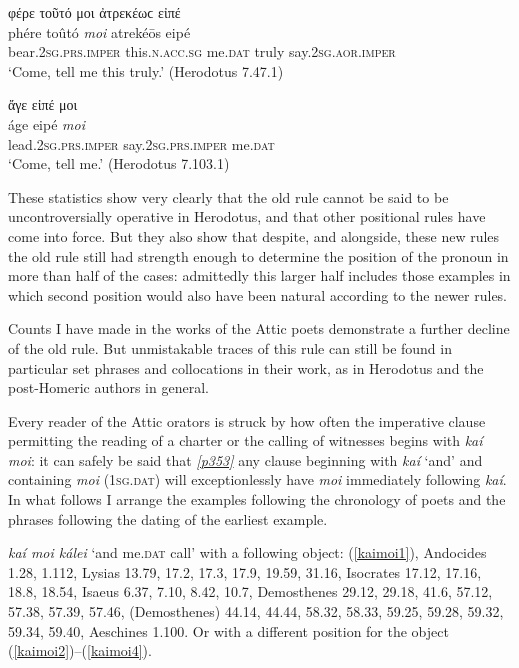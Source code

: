 \begin{exe}
\ex φέρε τοῦτό μοι ἀτρεκέωϲ εἰπέ\\
\gll phére toûtó \emph{moi} atrekéōs eipé\\
bear.\textsc{2sg.prs.imper} this.\textsc{n.acc.sg} me.\textsc{dat}
truly say.\textsc{2sg.aor.imper}\\
\trans `Come, tell me this truly.' (Herodotus 7.47.1)
\label{moi2}
\end{exe}

\begin{exe}
\ex ἄγε εἰπέ μοι\\
\gll áge eipé \emph{moi}\\
lead.\textsc{2sg.prs.imper} say.\textsc{2sg.prs.imper}
me.\textsc{dat}\\
\trans `Come, tell me.' (Herodotus 7.103.1)
\label{moi3}
\end{exe}

These statistics show very clearly that the old rule cannot be said to be uncontroversially operative in Herodotus, and that other positional rules have come into force. But they also show that despite, and alongside, these new rules the old rule still had strength enough to determine the position of the pronoun in more than half of the cases: admittedly this larger half includes those examples in which second position would also have been natural according to the newer rules.

Counts I have made in the works of the Attic poets demonstrate a further decline of the old rule. But unmistakable traces of this rule can still be found in particular set phrases and collocations in their work, as in Herodotus and the post-Homeric authors in general.

Every reader of the Attic orators is struck by how often the imperative clause permitting the reading of a charter or the calling of witnesses begins with \textit{kaí moi}: it can safely be said that \hyperlink{p353}{\emph{[p353]}} any clause beginning with \textit{kaí} `and' and containing \textit{moi} (\textsc{1sg.dat}) will exceptionlessly have \textit{moi} immediately following \textit{kaí}. In what follows I arrange the examples following the chronology of poets and the phrases following the dating of the earliest example.

\textit{kaí moi kálei} `and me.\textsc{dat} call' with a following object: (\ref{kaimoi1}), Andocides 1.28, 1.112, Lysias 13.79, 17.2, 17.3, 17.9, 19.59, 31.16, Isocrates 17.12, 17.16, 18.8, 18.54, Isaeus 6.37, 7.10, 8.42, 10.7, Demosthenes 29.12, 29.18, 41.6, 57.12, 57.38, 57.39, 57.46, (Demosthenes) 44.14, 44.44, 58.32, 58.33, 59.25, 59.28, 59.32, 59.34, 59.40, Aeschines 1.100. Or with a different position for the object (\ref{kaimoi2})--(\ref{kaimoi4}).

